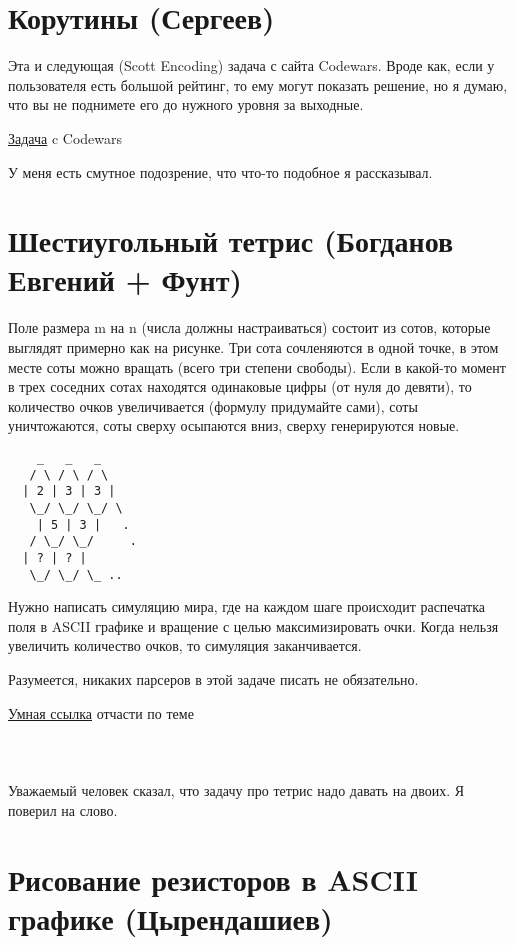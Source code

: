 \documentclass[a4paper,14pt]{article}
\begin{document}
\section{Корутины (Сергеев)}

Эта и следующая (Scott Encoding) задача с сайта Codewars. Вроде как, если у пользователя есть большой рейтинг, то ему могут показать решение, но я думаю, что вы не поднимете его до нужного уровня за выходные.

\href{https://www.codewars.com/kata/coroutines}{Задача} c Codewars

У меня есть смутное подозрение, что что-то подобное я рассказывал.

\section{Шестиугольный тетрис (Богданов Евгений + Фунт)}

Поле размера m на n (числа должны настраиваться) состоит из сотов, которые выглядят примерно как на рисунке. Три сота сочленяются в одной точке, в этом месте соты можно вращать (всего три степени свободы). Если в какой-то момент в трех соседних сотах находятся одинаковые цифры (от нуля до девяти), то количество очков увеличивается (формулу придумайте сами), соты уничтожаются, соты сверху осыпаются вниз, сверху генерируются новые.

\begin{verbatim}
    _   _   _
   / \ / \ / \
  | 2 | 3 | 3 |
   \_/ \_/ \_/ \
    | 5 | 3 |   .
   / \_/ \_/     .
  | ? | ? |       
   \_/ \_/ \_ ..
\end{verbatim}

Нужно написать симуляцию мира, где на каждом шаге происходит распечатка поля в ASCII графике и вращение с целью максимизировать очки. Когда нельзя увеличить количество очков, то симуляция заканчивается.

Разумеется, никаких парсеров в этой задаче писать не обязательно.

\href{https://www.redblobgames.com/grids/hexagons/}{Умная ссылка} отчасти по теме

\section{$ $}

Уважаемый человек сказал, что задачу про тетрис надо давать на двоих. Я поверил на слово.
 
\section{Рисование резисторов в ASCII графике (Цырендашиев)}
\end{document}
